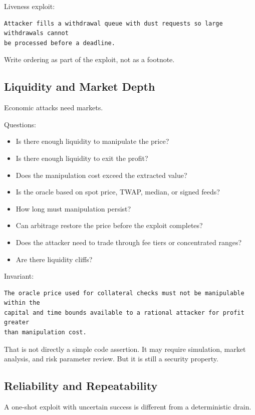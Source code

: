 Liveness exploit:

\begin{lstlisting}
Attacker fills a withdrawal queue with dust requests so large withdrawals cannot
be processed before a deadline.
\end{lstlisting}

Write ordering as part of the exploit, not as a footnote.

\subsection{Liquidity and Market Depth}

Economic attacks need markets.

Questions:

\begin{itemize}
\tightlist
\item
  Is there enough liquidity to manipulate the price?
\item
  Is there enough liquidity to exit the profit?
\item
  Does the manipulation cost exceed the extracted value?
\item
  Is the oracle based on spot price, TWAP, median, or signed feeds?
\item
  How long must manipulation persist?
\item
  Can arbitrage restore the price before the exploit completes?
\item
  Does the attacker need to trade through fee tiers or concentrated
  ranges?
\item
  Are there liquidity cliffs?
\end{itemize}

Invariant:

\begin{lstlisting}
The oracle price used for collateral checks must not be manipulable within the
capital and time bounds available to a rational attacker for profit greater
than manipulation cost.
\end{lstlisting}

That is not directly a simple code assertion. It may require simulation,
market analysis, and risk parameter review. But it is still a security
property.

\subsection{Reliability and Repeatability}

A one-shot exploit with uncertain success is different from a
deterministic drain.

